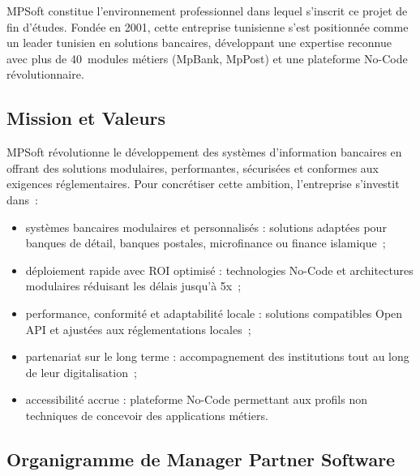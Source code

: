 \documentclass[a4paper,12pt,oneside]{report}
\begin{document}
MPSoft constitue l'environnement professionnel dans lequel s'inscrit ce projet de fin
d'études. Fondée en 2001, cette entreprise tunisienne s'est positionnée comme un
leader tunisien en solutions bancaires, développant une expertise reconnue avec
plus de 40~modules métiers (MpBank, MpPost) et une plateforme No-Code révolutionnaire.

\subsection{Mission et Valeurs}

MPSoft révolutionne le développement des systèmes d'information bancaires en offrant des
solutions modulaires, performantes, sécurisées et conformes aux exigences réglementaires.
Pour concrétiser cette ambition, l'entreprise s'investit dans~:

\begin{itemize}
  \item systèmes bancaires modulaires et personnalisés : solutions adaptées
        pour banques de détail, banques postales, microfinance ou finance islamique~;
  \item déploiement rapide avec ROI optimisé : technologies No-Code et
        architectures modulaires réduisant les délais jusqu'à 5x~;
  \item performance, conformité et adaptabilité locale : solutions compatibles
        Open API et ajustées aux réglementations locales~;
  \item partenariat sur le long terme : accompagnement des institutions tout au
        long de leur digitalisation~;
  \item accessibilité accrue : plateforme No-Code permettant aux profils non
        techniques de concevoir des applications métiers.
\end{itemize}

\subsection{Organigramme de Manager Partner Software}
\end{document}
